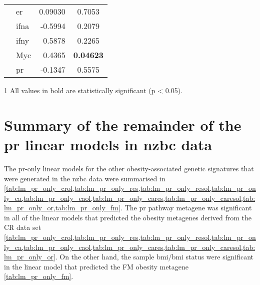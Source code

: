 \begin{table}[htpb]
\begin{threeparttable}
\begin{tabular}{llrc}
                                                                           & \gls{er}   & 0.09030  & 0.7053 \\
                                                                           & \gls{ifna} & -0.5994  & 0.2079 \\
                                                                           & \gls{ifny} & 0.5878   & 0.2265 \\
                                                                           & Myc        & 0.4365   & \bfseries{0.04623} \\
                                                                           & \gls{pr}   & -0.1347  & 0.5575 \\
				\hline
				\hline
			\end{tabular}
			\begin{tablenotes}
				\begin{footnotesize}
				\item [1] All values in bold are statistically significant (p \textless{} 0.05).
				\end{footnotesize}
			\end{tablenotes}
		\end{threeparttable}
	\end{table}

	\newpage

	\section{Summary of the remainder of the \gls{pr} linear models in \gls{nzbc} data}
	\label{sec:summary_of_the_pr_linear_models_in_nzbc_data}

	The \gls{pr}-only linear models for the other obesity-associated genetic signatures that were generated in the \gls{nzbc} data were summarised in \cref{tab:lm_pr_only_crol,tab:lm_pr_only_res,tab:lm_pr_only_resol,tab:lm_pr_only_ca,tab:lm_pr_only_caol,tab:lm_pr_only_cares,tab:lm_pr_only_caresol,tab:lm_pr_only_or,tab:lm_pr_only_fm}.
	The \gls{pr} pathway metagene was significant in all of the linear models that predicted the obesity metagenes derived from the CR data set \cref{tab:lm_pr_only_crol,tab:lm_pr_only_res,tab:lm_pr_only_resol,tab:lm_pr_only_ca,tab:lm_pr_only_caol,tab:lm_pr_only_cares,tab:lm_pr_only_caresol,tab:lm_pr_only_or}.
	On the other hand, the sample \gls{bmi}/\gls{bmi} status were significant in the linear model that predicted the FM obesity metagene \cref{tab:lm_pr_only_fm}.

